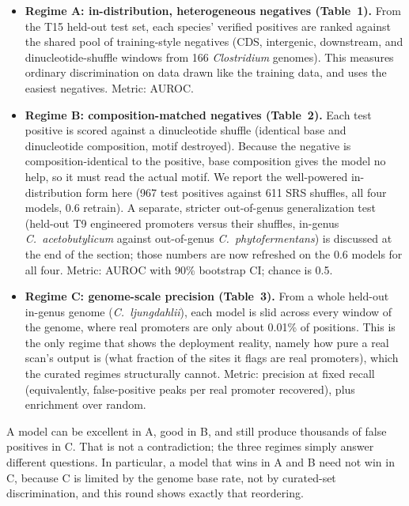 \documentclass{article}
\begin{document}
\begin{itemize}
\item \textbf{Regime A: in-distribution, heterogeneous negatives (Table~1).} From the T15 held-out test set, each species' verified positives are ranked against the shared pool of training-style negatives (CDS, intergenic, downstream, and dinucleotide-shuffle windows from 166 \emph{Clostridium} genomes). This measures ordinary discrimination on data drawn like the training data, and uses the easiest negatives. Metric: AUROC.
\item \textbf{Regime B: composition-matched negatives (Table~2).} Each test positive is scored against a dinucleotide shuffle (identical base and dinucleotide composition, motif destroyed). Because the negative is composition-identical to the positive, base composition gives the model no help, so it must read the actual motif. We report the well-powered in-distribution form here (967 test positives against 611 SRS shuffles, all four models, 0.6 retrain). A separate, stricter out-of-genus generalization test (held-out T9 engineered promoters versus their shuffles, in-genus \emph{C.\ acetobutylicum} against out-of-genus \emph{C.\ phytofermentans}) is discussed at the end of the section; those numbers are now refreshed on the 0.6 models for all four. Metric: AUROC with 90\% bootstrap CI; chance is 0.5.
\item \textbf{Regime C: genome-scale precision (Table~3).} From a whole held-out in-genus genome (\emph{C.\ ljungdahlii}), each model is slid across every window of the genome, where real promoters are only about 0.01\% of positions. This is the only regime that shows the deployment reality, namely how pure a real scan's output is (what fraction of the sites it flags are real promoters), which the curated regimes structurally cannot. Metric: precision at fixed recall (equivalently, false-positive peaks per real promoter recovered), plus enrichment over random.
\end{itemize}

\noindent A model can be excellent in A, good in B, and still produce thousands of false positives in C. That is not a contradiction; the three regimes simply answer different questions. In particular, a model that wins in A and B need not win in C, because C is limited by the genome base rate, not by curated-set discrimination, and this round shows exactly that reordering.
\end{document}
